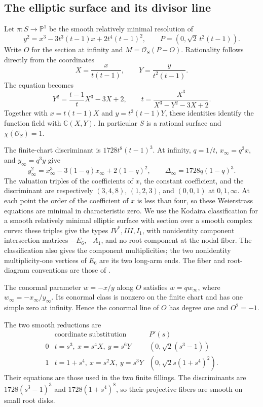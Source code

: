 \documentclass[11pt]{article}
\numberwithin{equation}{section}
\begin{document}
\subsection{The elliptic surface and its divisor line}

Let $\pi:S\to\mathbb P^1$ be the smooth relatively minimal resolution
of
\begin{equation}\label{hol:eq:surface}
 y^2=x^3-3t^3(t-1)x+2t^4(t-1)^2,
 \qquad P=(0,\sqrt2\,t^2(t-1)).
\end{equation}
Write $O$ for the section at infinity and
$M=\mathcal O_S(P-O)$. Rationality follows directly from the
coordinates
\[
 X=\frac{x}{t(t-1)},\qquad Y=\frac{y}{t^2(t-1)}.
\]
The equation becomes
\[
 Y^2=\frac{t-1}{t}X^3-3X+2,
 \qquad
 t=\frac{X^3}{X^3-Y^2-3X+2}.
\]
Together with $x=t(t-1)X$ and $y=t^2(t-1)Y$, these identities
identify the function field with $\mathbb C(X,Y)$. In particular
$S$ is a rational surface and $\chi(\mathcal O_S)=1$.

The finite-chart discriminant is $1728t^8(t-1)^3$. At infinity,
$q=1/t$, $x_\infty=q^2x$, and $y_\infty=q^3y$ give
\[
 y_\infty^2=x_\infty^3-3(1-q)x_\infty+2(1-q)^2,
 \qquad \Delta_\infty=1728q(1-q)^3.
\]
The valuation triples of the coefficients of $x$, the constant
coefficient, and the discriminant are respectively
$(3,4,8)$, $(1,2,3)$, and $(0,0,1)$ at $0,1,\infty$.
At each point the order of the coefficient of $x$ is less than
four, so these Weierstrass equations are minimal in characteristic
zero.
We use the Kodaira classification for a smooth relatively minimal
elliptic surface with section over a smooth complex curve: these
triples give the types $IV^*,III,I_1$, with nonidentity component
intersection matrices $-E_6,-A_1$, and no root component at the
nodal fiber. The classification also gives the component
multiplicities; the two nonidentity multiplicity-one vertices of
$E_6$ are its two long-arm ends. The fiber and root-diagram
conventions are those of \cite[\S2.1]{DolgachevMartin}.

The conormal parameter $w=-x/y$ along $O$ satisfies
$w=q w_\infty$, where $w_\infty=-x_\infty/y_\infty$.
Its conormal class is nonzero on the finite chart and has one
simple zero at infinity. Hence the conormal line of $O$ has
degree one and $O^2=-1$.

The two smooth reductions are
\begin{equation}\label{hol:eq:reductions}
\begin{array}{c|c|c}
 &\text{coordinate substitution}&P'(s)\\ \hline
0&t=s^3,\ x=s^4X,\ y=s^6Y&(0,\sqrt2(s^3-1))\\
1&t=1+s^4,\ x=s^2X,\ y=s^3Y&(0,\sqrt2 s(1+s^4)^2).
\end{array}
\end{equation}
Their equations are those used in the two finite fillings. The
discriminants are $1728(s^3-1)^3$ and $1728(1+s^4)^8$, so their
projective fibers are smooth on small root disks.
\end{document}
